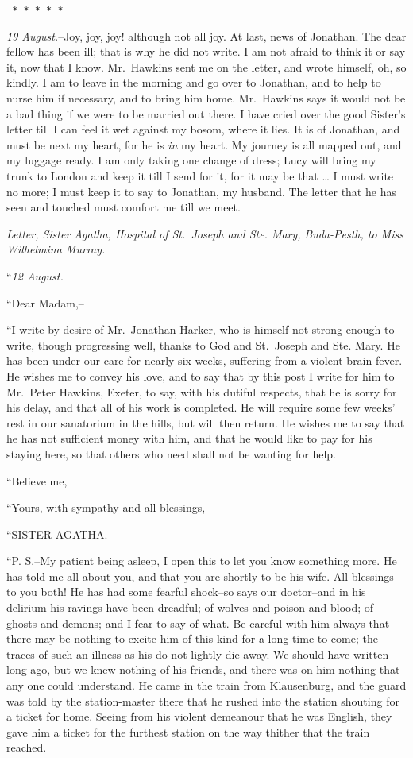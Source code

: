 \documentclass[12pt,openright]{book}
\begin{document}
\texttt{   *       *       *       *       *}

\textit{19 August.}–Joy, joy, joy! although not all joy. At last, news of Jonathan. The dear fellow has been ill; that is why he did not write. I am not afraid to think it or say it, now that I know. Mr. Hawkins sent me on the letter, and wrote himself, oh, so kindly. I am to leave in the morning and go over to Jonathan, and to help to nurse him if necessary, and to bring him home. Mr. Hawkins says it would not be a bad thing if we were to be married out there. I have cried over the good Sister’s letter till I can feel it wet against my bosom, where it lies. It is of Jonathan, and must be next my heart, for he is \textit{in} my heart. My journey is all mapped out, and my luggage ready. I am only taking one change of dress; Lucy will bring my trunk to London and keep it till I send for it, for it may be that … I must write no more; I must keep it to say to Jonathan, my husband. The letter that he has seen and touched must comfort me till we meet.

\textit{Letter, Sister Agatha, Hospital of St. Joseph and Ste. Mary,}\textit{ }\textit{Buda-Pesth, to Miss Wilhelmina Murray.}

“\textit{12 August.}

“Dear Madam,–

“I write by desire of Mr. Jonathan Harker, who is himself not strong enough to write, though progressing well, thanks to God and St. Joseph and Ste. Mary. He has been under our care for nearly six weeks, suffering from a violent brain fever. He wishes me to convey his love, and to say that by this post I write for him to Mr. Peter Hawkins, Exeter, to say, with his dutiful respects, that he is sorry for his delay, and that all of his work is completed. He will require some few weeks’ rest in our sanatorium in the hills, but will then return. He wishes me to say that he has not sufficient money with him, and that he would like to pay for his staying here, so that others who need shall not be wanting for help.

“Believe me,

“Yours, with sympathy and all blessings,

“SISTER AGATHA.

“P. S.–My patient being asleep, I open this to let you know something more. He has told me all about you, and that you are shortly to be his wife. All blessings to you both! He has had some fearful shock–so says our doctor–and in his delirium his ravings have been dreadful; of wolves and poison and blood; of ghosts and demons; and I fear to say of what. Be careful with him always that there may be nothing to excite him of this kind for a long time to come; the traces of such an illness as his do not lightly die away. We should have written long ago, but we knew nothing of his friends, and there was on him nothing that any one could understand. He came in the train from Klausenburg, and the guard was told by the station-master there that he rushed into the station shouting for a ticket for home. Seeing from his violent demeanour that he was English, they gave him a ticket for the furthest station on the way thither that the train reached.
\end{document}
